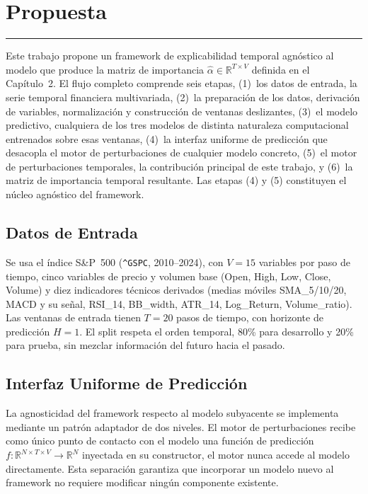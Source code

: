 \chapter{Propuesta}
\hrule \bigskip \vspace*{1cm}
\label{chap:propuesta}

Este trabajo propone un framework de explicabilidad temporal agnóstico al modelo que produce la matriz de importancia $\hat{\alpha} \in \mathbb{R}^{T \times V}$ definida en el Capítulo~2. El flujo completo comprende seis etapas, (1)~los datos de entrada, la serie temporal financiera multivariada, (2)~la preparación de los datos, derivación de variables, normalización y construcción de ventanas deslizantes, (3)~el modelo predictivo, cualquiera de los tres modelos de distinta naturaleza computacional entrenados sobre esas ventanas, (4)~la interfaz uniforme de predicción que desacopla el motor de perturbaciones de cualquier modelo concreto, (5)~el motor de perturbaciones temporales, la contribución principal de este trabajo, y (6)~la matriz de importancia temporal resultante. Las etapas (4) y (5) constituyen el núcleo agnóstico del framework.

\section{Datos de Entrada}

Se usa el índice S\&P~500 (\texttt{\^{}GSPC}, 2010--2024), con $V=15$ variables por paso de tiempo, cinco variables de precio y volumen base (Open, High, Low, Close, Volume) y diez indicadores técnicos derivados (medias móviles SMA\_5/10/20, MACD y su señal, RSI\_14, BB\_width, ATR\_14, Log\_Return, Volume\_ratio). Las ventanas de entrada tienen $T=20$ pasos de tiempo, con horizonte de predicción $H=1$. El split respeta el orden temporal, 80\% para desarrollo y 20\% para prueba, sin mezclar información del futuro hacia el pasado.

\section{Interfaz Uniforme de Predicción}

La agnosticidad del framework respecto al modelo subyacente se implementa mediante un patrón adaptador de dos niveles. El motor de perturbaciones recibe como único punto de contacto con el modelo una función de predicción $f: \mathbb{R}^{N \times T \times V} \rightarrow \mathbb{R}^N$ inyectada en su constructor, el motor nunca accede al modelo directamente. Esta separación garantiza que incorporar un modelo nuevo al framework no requiere modificar ningún componente existente.

